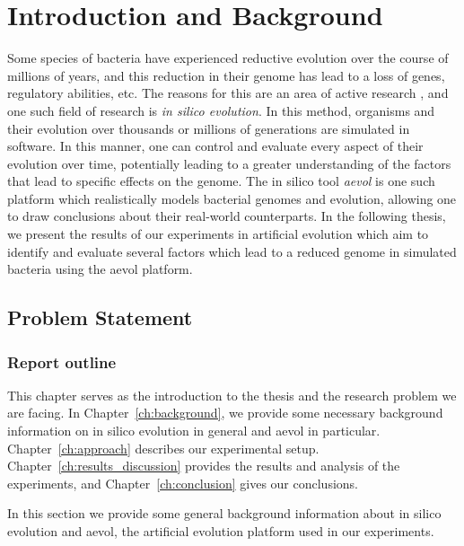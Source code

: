 \chapter{Introduction and Background}\label{ch:intro}
Some species of bacteria have experienced reductive evolution over the course of millions of years, and this reduction in their genome has lead to a loss of genes, regulatory abilities, etc. The reasons for this are an area of active research %
, and one such field of research is \textit{in silico evolution}. In this method, organisms and their evolution over thousands or millions of generations are simulated in software. In this manner, one can control and evaluate every aspect of their evolution over time, potentially leading to a greater understanding of the factors that lead to specific effects on the genome. The in silico tool \textit{aevol} is one such platform which realistically models bacterial genomes and evolution, allowing one to draw conclusions about their real-world counterparts. In the following thesis, we present the results of our experiments in artificial evolution which aim to identify and evaluate several factors which lead to a reduced genome in simulated bacteria using the aevol platform. 

\section{Problem Statement}


\subsection{Report outline}
This chapter serves as the introduction to the thesis and the research problem we are facing. In Chapter~\ref{ch:background}, we provide some necessary background information on in silico evolution in general and aevol in particular. Chapter~\ref{ch:approach} describes our experimental setup. Chapter~\ref{ch:results_discussion}
provides the results and analysis of the experiments, and Chapter~\ref{ch:conclusion} gives our conclusions. 

In this section we provide some general background information about in silico evolution and aevol, the artificial evolution platform used in our experiments. 

